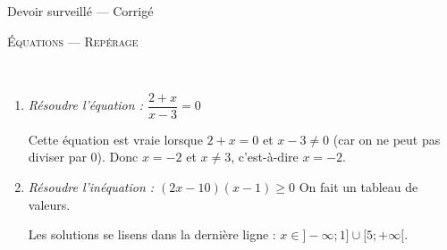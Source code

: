 \documentclass[11pt]{article}
\begin{document}
\begin{center}
  {\large
    Devoir surveillé --- Corrigé

    \textsc{Équations --- Repérage}
  }
\end{center}

\begin{exercice}[(In)équations]~
  \begin{enumerate}
    \item \emph{Résoudre l'équation :
      $\dfrac{2+x}{x-3}=0$}

      Cette équation est vraie lorsque $2+x=0$ et $x-3\neq0$ (car on ne peut pas diviser par 0). Donc $x=-2$ et $x\neq3$, c'est-à-dire $x=-2$.
    \item \emph{Résoudre l'inéquation :
      $(2x-10)(x-1)\geq0$}
      On fait un tableau de valeurs.


      Les solutions se lisens dans la dernière ligne : $x\in]-\infty;1]\cup[5;+\infty[$.
  \end{enumerate}
\end{exercice}
\end{document}
